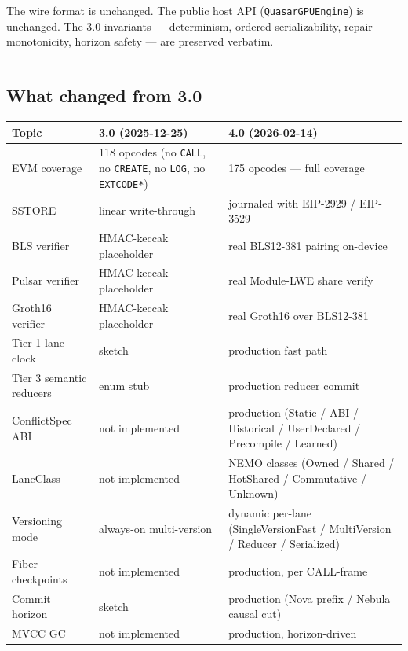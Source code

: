 \documentclass[
]{article}
\newcounter{none} %
\begin{document}
The wire format is unchanged. The public host API
(\texttt{QuasarGPUEngine}) is unchanged. The 3.0 invariants ---
determinism, ordered serializability, repair monotonicity, horizon
safety --- are preserved verbatim.

\begin{center}\rule{0.5\linewidth}{0.5pt}\end{center}

\subsection{What changed from 3.0}\label{what-changed-from-30}

{\def\LTcaptype{none} %
\begin{longtable}[]{@{}lll@{}}
\toprule\noalign{}
Topic & 3.0 (2025-12-25) & 4.0 (2026-02-14) \\
\midrule\noalign{}
\endhead
\bottomrule\noalign{}
\endlastfoot
EVM coverage & 118 opcodes (no \texttt{CALL}, no \texttt{CREATE}, no
\texttt{LOG}, no \texttt{EXTCODE*}) & 175 opcodes --- full coverage \\
SSTORE & linear write-through & journaled with EIP-2929 / EIP-3529 \\
BLS verifier & HMAC-keccak placeholder & real BLS12-381 pairing
on-device \\
Pulsar verifier & HMAC-keccak placeholder & real Module-LWE share
verify \\
Groth16 verifier & HMAC-keccak placeholder & real Groth16 over
BLS12-381 \\
Tier 1 lane-clock & sketch & production fast path \\
Tier 3 semantic reducers & enum stub & production reducer commit \\
ConflictSpec ABI & not implemented & production (Static / ABI /
Historical / UserDeclared / Precompile / Learned) \\
LaneClass & not implemented & NEMO classes (Owned / Shared / HotShared /
Commutative / Unknown) \\
Versioning mode & always-on multi-version & dynamic per-lane
(SingleVersionFast / MultiVersion / Reducer / Serialized) \\
Fiber checkpoints & not implemented & production, per CALL-frame \\
Commit horizon & sketch & production (Nova prefix / Nebula causal
cut) \\
MVCC GC & not implemented & production, horizon-driven \\

\end{longtable}}
\end{document}
